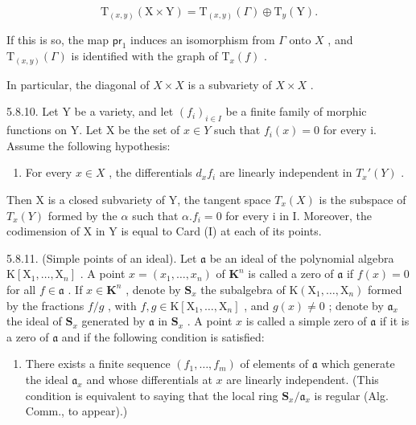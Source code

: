 \[
\mathrm{T} _ {(x, y)} (\mathrm{X} \times \mathrm{Y}) = \mathrm{T} _ {(x, y)} (\Gamma) \oplus \mathrm{T} _ {y} (\mathrm{Y}).
\]

If this is so, the map \(\mathsf{pr}_1\) induces an isomorphism from \(\Gamma\) onto \(X\) , and \(\mathrm{T}_{(x,y)}(\Gamma)\) is identified with the graph of \(\mathrm{T}_x(f)\) .

In particular, the diagonal of \(X \times X\) is a subvariety of \(X \times X\) .

5.8.10. Let Y be a variety, and let \((f_{i})_{i\in I}\) be a finite family of morphic functions on Y. Let X be the set of \(x\in Y\) such that \(f_{i}(x)=0\) for every i. Assume the following hypothesis:

\begin{enumerate}
\def\labelenumi{(\Alph{enumi})}
\setcounter{enumi}{9}
\tightlist
\item
  For every \(x \in X\) , the differentials \(d_x f_i\) are linearly independent in \(T_x'(Y)\) .
\end{enumerate}

Then X is a closed subvariety of Y, the tangent space \(T_{x}(X)\) is the subspace of \(T_{x}(Y)\) formed by the \(\alpha\) such that \(\alpha.f_{i}=0\) for every i in I. Moreover, the codimension of X in Y is equal to Card (I) at each of its points.

5.8.11. (Simple points of an ideal). Let \(\mathfrak{a}\) be an ideal of the polynomial algebra \(\mathrm{K}[\mathrm{X}_1,\ldots ,\mathrm{X}_n]\) . A point \(x = (x_{1},\dots,x_{n})\) of \(\mathbf{K}^n\) is called a zero of \(\mathfrak{a}\) if \(f(x) = 0\) for all \(f\in \mathfrak{a}\) . If \(x\in \mathbf{K}^n\) , denote by \(\mathbf{S}_x\) the subalgebra of \(\mathrm{K}(\mathrm{X}_1,\dots,\mathrm{X}_n)\) formed by the fractions \(f / g\) , with \(f,g\in \mathrm{K}[\mathrm{X}_1,\dots,\mathrm{X}_n]\) , and \(g(x)\neq 0\) ; denote by \(\mathfrak{a}_x\) the ideal of \(\mathbf{S}_x\) generated by \(\mathfrak{a}\) in \(\mathbf{S}_x\) . A point \(x\) is called a simple zero of \(\mathfrak{a}\) if it is a zero of \(\mathfrak{a}\) and if the following condition is satisfied:

\begin{enumerate}
\def\labelenumi{(\Alph{enumi})}
\setcounter{enumi}{18}
\tightlist
\item
  There exists a finite sequence \((f_1, \ldots, f_m)\) of elements of \(\mathfrak{a}\) which generate the ideal \(\mathfrak{a}_x\) and whose differentials at \(x\) are linearly independent. (This condition is equivalent to saying that the local ring \(\mathbf{S}_x / \mathfrak{a}_x\) is regular (Alg. Comm., to appear).)
\end{enumerate}

